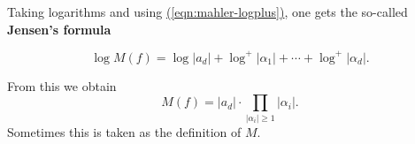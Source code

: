 \documentclass{article}
\newcommand{\eqnref}[1]{\hyperref[#1]{(\ref*{#1})}}
\theoremstyle{definition}
\newtheorem{example}[proposition]{Example}
\newcommand{\term}{\textbf}
\begin{document}
Taking logarithms and using \eqnref{eqn:mahler-logplus}, one gets the so-called
\term{Jensen's formula}

\begin{equation}
  \label{eqn:jensen-formula} \log M (f) = \log |a_d| + \log^+ |\alpha_1| + \cdots + \log^+ |\alpha_d|.
\end{equation}

From this we obtain
$$M (f) = |a_d| \cdot \prod_{|\alpha_i| \ge 1} |\alpha_i|.$$
Sometimes this is taken as the definition of $M$.


\end{document}

